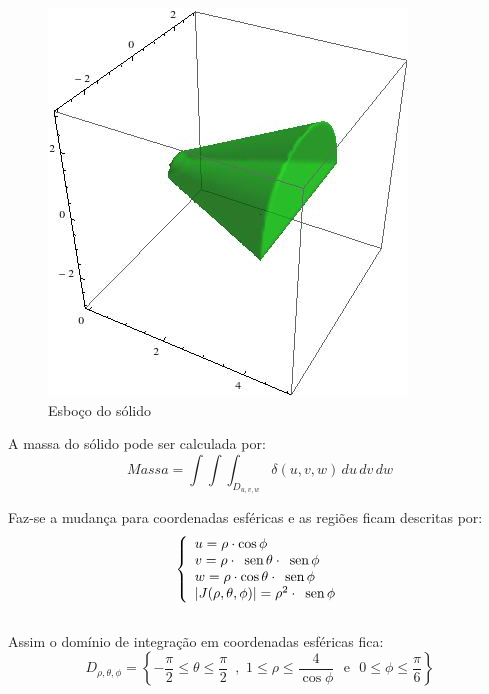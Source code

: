 \documentclass[12pt,a4paper]{article}
\newcommand{\sen}{\mbox{\, sen}\,}
\begin{document}
\begin{figure}[h!]
	\centering
	\includegraphics[scale=0.5]{Q3A.jpg}  
	\caption{Esboço do sólido}
	\label{fig:figura6}
\end{figure}

A massa do sólido pode ser calculada por:
$$ Massa = \int\!\!\int\!\!\int_{D_{u,v,w}} \delta(u,v,w)\,du\,dv\,dw $$

Faz-se a mudança para coordenadas esféricas e as regiões ficam descritas por:
$$\left\{\begin{array}{lc}
u=\rho \cdot \cos{\phi}\\
v=\rho \cdot \sen{\theta}\cdot \sen{\phi}\\
w=\rho \cdot \cos{\theta}\cdot \sen{\phi} \\
|J(\rho,\theta,\phi)|=\rho^2 \cdot \sen{\phi}
\end{array}\right.
$$
\\
Assim o domínio de integração em coordenadas esféricas fica:\\
$$D_{\rho,\theta,\phi}= \left\{-\frac{\pi}{2} \leq \theta \leq \frac{\pi}{2}\, \,\, , \,\, 1 \leq \rho \leq \frac{4}{\cos{\phi}}\, \, \mbox{  e  } 
\,\,0 \leq \phi \leq \frac{\pi}{6}\right\}$$
\end{document}
